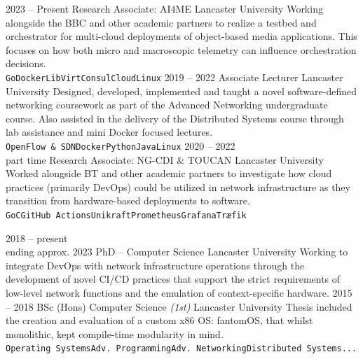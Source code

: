 \documentclass[9pt]{developercv} %
\begin{document}
\begin{entrylist}
	\entry
	{2023 -- Present}
	{Research Associate: AI4ME}
	{Lancaster University}
	{Working alongside the BBC and other academic partners to realize a testbed
		and orchestrator for multi-cloud deployments of object-based media
		applications. This focuses on how both micro and macroscopic telemetry can
		influence orchestration decisions.\\
		\texttt{Go}\slashsep\texttt{Docker}\slashsep\texttt{LibVirt}\slashsep\texttt{Consul}\slashsep\texttt{Cloud}\slashsep\texttt{Linux}}
	\entry
	{2019 -- 2022}
	{Associate Lecturer}
	{Lancaster University}
	{Designed, developed, implemented and taught a novel software-defined
		networking coursework as part of the Advanced Networking undergraduate course.
		Also assisted in the delivery of the Distributed Systems course through lab
		assistance and mini Docker focused lectures.
		\\
		\texttt{OpenFlow \& SDN}\slashsep\texttt{Docker}\slashsep\texttt{Python}\slashsep\texttt{Java}\slashsep\texttt{Linux}}
	\entry
	{2020 -- 2022\\\footnotesize{part time}}
	{Research Associate: NG-CDI \& TOUCAN}
	{Lancaster University}
	{Worked alongside BT and other academic partners to investigate how cloud
		practices (primarily DevOps) could be utilized in network infrastructure as
		they transition from hardware-based deployments to software.\\
		\texttt{Go}\slashsep\texttt{C}\slashsep\texttt{GitHub Actions}\slashsep\texttt{Unikraft}\slashsep\texttt{Prometheus}\slashsep\texttt{Grafana}\slashsep\texttt{Træfik}}
\end{entrylist}


\vspace{-1em}

\begin{entrylist}
	\entry
	{2018 -- present\\\footnotesize{ending approx. 2023}}
	{PhD -- Computer Science}
	{Lancaster University}
	{Working to integrate DevOps with network infrastructure operations through the
		development of novel CI/CD practices that support the strict requirements of
		low-level network functions and the emulation of context-specific hardware.}
	\entry
	{2015 -- 2018}
	{BSc (Hons) Computer Science \textit{(1st)}}
	{Lancaster University}
	{Thesis included the creation and evaluation of a custom x86 OS: fantomOS, that whilst
		monolithic, kept compile-time modularity in
		mind.\\\texttt{Operating Systems}\slashsep\texttt{Adv.
			Programming}\slashsep\texttt{Adv. Networking}\slashsep\texttt{Distributed Systems}\slashsep\texttt{...}}
\end{entrylist}
\end{document}
